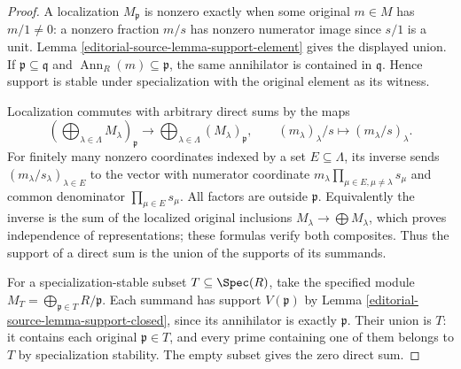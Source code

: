 \begin{proof}
A localization $M_{\mathfrak p}$ is nonzero exactly when
some original $m\in M$ has $m/1\ne0$: a nonzero fraction
$m/s$ has nonzero numerator image since $s/1$ is a unit.
Lemma \ref{editorial-source-lemma-support-element} gives the displayed union.
If $\mathfrak p\subseteq\mathfrak q$ and
$\operatorname{Ann}_R(m)\subseteq\mathfrak p$, the same
annihilator is contained in $\mathfrak q$. Hence support
is stable under specialization with the original element
as its witness.

Localization commutes with arbitrary direct sums by the
maps
$$
(\bigoplus_{\lambda\in\Lambda}M_\lambda)_{\mathfrak p}
\longrightarrow\bigoplus_{\lambda\in\Lambda}(M_\lambda)_{\mathfrak p},
\qquad (m_\lambda)_\lambda/s\longmapsto(m_\lambda/s)_\lambda.
$$
For finitely many nonzero coordinates indexed by a set
$E\subseteq\Lambda$, its inverse sends
$(m_\lambda/s_\lambda)_{\lambda\in E}$ to the vector
with numerator coordinate
$m_\lambda\prod_{\mu\in E,\mu\ne\lambda}s_\mu$
and common denominator $\prod_{\mu\in E}s_\mu$.
All factors are outside $\mathfrak p$.
Equivalently the inverse is the sum of the localized
original inclusions $M_\lambda\to\bigoplus M_\lambda$,
which proves independence of representations; these
formulas verify both composites. Thus the support of
a direct sum is the union of the supports of its summands.

For a specialization-stable subset $T\subseteq\Spec(R)$,
take the specified module
$M_T=\bigoplus_{\mathfrak p\in T}R/\mathfrak p$.
Each summand has support $V(\mathfrak p)$ by
Lemma \ref{editorial-source-lemma-support-closed}, since its annihilator
is exactly $\mathfrak p$. Their union is $T$: it contains
each original $\mathfrak p\in T$, and every prime
containing one of them belongs to $T$ by specialization
stability. The empty subset gives the zero direct sum.
\end{proof}